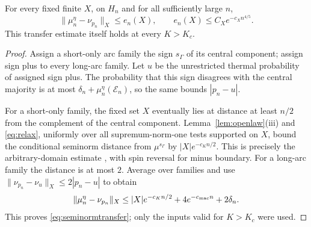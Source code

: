 \begin{lemma}\label{lem:seminormtransfer}
For every fixed finite $X$, on $H_n$ and for all sufficiently large $n$,
\begin{equation}\label{eq:seminormtransfer}
 \|\mu_n^\eta-\nu_{p_n}\|_X\le e_n(X),\qquad
 e_n(X)\le C_Xe^{-c_X n^{4/5}}.
\end{equation}
This transfer estimate itself holds at every $K>K_c$.
\end{lemma}
\begin{proof}
Assign a short-only arc family the sign $s_\Gamma$ of its central component; assign sign plus to every long-arc family. Let $u$ be the unrestricted thermal probability of assigned sign plus. The probability that this sign disagrees with the central majority is at most $\delta_n+\mu_n^\eta(\mathcal E_n)$, so the same bounds $|p_n-u|$.

For a short-only family, the fixed set $X$ eventually lies at distance at least $n/2$ from the complement of the central component. Lemma~\ref{lem:openlaw}(iii) and \eqref{eq:relax}, uniformly over all supremum-norm-one tests supported on $X$, bound the conditional seminorm distance from $\mu^{s_\Gamma}$ by $|X|e^{-c_K n/2}$. This is precisely the arbitrary-domain estimate \cite[(A.8)]{CV}, with spin reversal for minus boundary. For a long-arc family the distance is at most $2$. Average over families and use $\|\nu_{p_n}-\nu_u\|_X\le2|p_n-u|$ to obtain
\[
 \|\mu_n^\eta-\nu_{p_n}\|_X
 \le |X|e^{-c_K n/2}+4e^{-c_{\rm mac}n}+2\delta_n.
\]
This proves \eqref{eq:seminormtransfer}; only the inputs valid for $K>K_c$ were used.
\end{proof}

